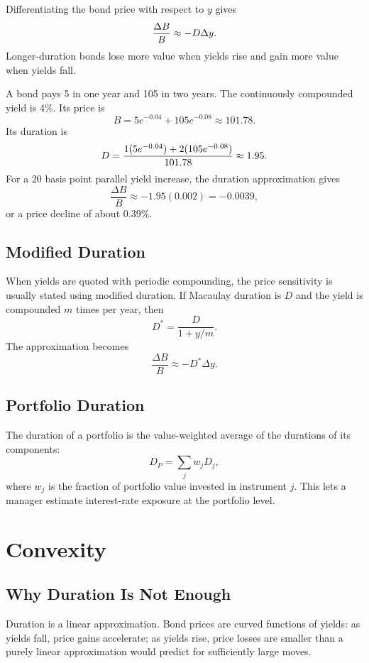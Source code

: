 Differentiating the bond price with respect to $y$ gives
\[
    \frac{\Delta B}{B}\approx -D \Delta y.
\]
Longer-duration bonds lose more value when yields rise and gain more value when
yields fall.

\begin{exmp}
A bond pays 5 in one year and 105 in two years. The continuously compounded
yield is 4\%. Its price is
\[
    B=5e^{-0.04}+105e^{-0.08}\approx 101.78.
\]
Its duration is
\[
    D=
    \frac{1(5e^{-0.04})+2(105e^{-0.08})}{101.78}
    \approx 1.95.
\]
For a 20 basis point parallel yield increase, the duration approximation gives
\[
    \frac{\Delta B}{B}\approx -1.95(0.002)=-0.0039,
\]
or a price decline of about 0.39\%.
\end{exmp}

\subsection{Modified Duration}

When yields are quoted with periodic compounding, the price sensitivity is
usually stated using modified duration. If Macaulay duration is $D$ and the
yield is compounded $m$ times per year, then
\[
    D^*=\frac{D}{1+y/m}.
\]
The approximation becomes
\[
    \frac{\Delta B}{B}\approx -D^* \Delta y.
\]

\subsection{Portfolio Duration}

The duration of a portfolio is the value-weighted average of the durations of
its components:
\[
    D_P=\sum_j w_j D_j,
\]
where $w_j$ is the fraction of portfolio value invested in instrument $j$.
This lets a manager estimate interest-rate exposure at the portfolio level.

\section{Convexity}

\subsection{Why Duration Is Not Enough}

Duration is a linear approximation. Bond prices are curved functions of yields:
as yields fall, price gains accelerate; as yields rise, price losses are
smaller than a purely linear approximation would predict for sufficiently large
moves.

